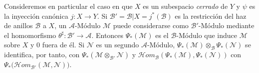 \begin{env}[4.2.5]
\label{0.4.2.5-fr}
Consideremos en particular el caso en que $X$ es un subespacio
\emph{cerrado} de $Y$ y $\psi$ es la inyección canónica $j:X\to Y$. Si
$\mathcal{B}'=\mathcal{B}|X=j^*(\mathcal{B})$ es la restricción del haz
de anillos $\mathcal{B}$ a $X$, un $\mathcal{A}$-Módulo $\mathcal{M}$ puede
considerarse como $\mathcal{B}'$-Módulo mediante el homomorfismo
$\theta^\sharp:\mathcal{B}'\to\mathcal{A}$. Entonces $\Psi_*(\mathcal{M})$
es el $\mathcal{B}$-Módulo que induce $\mathcal{M}$ sobre $X$ y $0$ fuera
de él. Si $\mathcal{N}$ es un segundo $\mathcal{A}$-Módulo,
$\Psi_*(\mathcal{M})\otimes_{\mathcal{B}}\Psi_*(\mathcal{N})$ se identifica,
por tanto, con $\Psi_*(\mathcal{M}\otimes_{\mathcal{B}'}\mathcal{N})$ y
$\mathcal{H}\!om_{\mathcal{B}}(\Psi_*(\mathcal{M}),\Psi_*(\mathcal{N}))$
con
$\Psi_*\bigl(\mathcal{H}\!om_{\mathcal{B}'}(\mathcal{M},\mathcal{N})\bigr)$.
\end{env}

